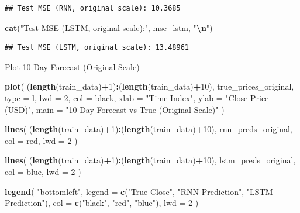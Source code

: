 \documentclass[
]{article}
\newenvironment{Shaded}{\begin{snugshade}}{\end{snugshade}}
\newcommand{\AttributeTok}[1]{\textcolor[rgb]{0.13,0.29,0.53}{#1}}
\newcommand{\DecValTok}[1]{\textcolor[rgb]{0.00,0.00,0.81}{#1}}
\newcommand{\FunctionTok}[1]{\textcolor[rgb]{0.13,0.29,0.53}{\textbf{#1}}}
\newcommand{\NormalTok}[1]{#1}
\newcommand{\SpecialCharTok}[1]{\textcolor[rgb]{0.81,0.36,0.00}{\textbf{#1}}}
\newcommand{\StringTok}[1]{\textcolor[rgb]{0.31,0.60,0.02}{#1}}
\begin{document}
\begin{verbatim}
## Test MSE (RNN, original scale): 10.3685
\end{verbatim}

\begin{Shaded}
\begin{Highlighting}[]
\FunctionTok{cat}\NormalTok{(}\StringTok{"Test MSE (LSTM, original scale):"}\NormalTok{, mse\_lstm, }\StringTok{"}\SpecialCharTok{\textbackslash{}n}\StringTok{"}\NormalTok{)}
\end{Highlighting}
\end{Shaded}

\begin{verbatim}
## Test MSE (LSTM, original scale): 13.48961
\end{verbatim}

Plot 10-Day Forecast (Original Scale)

\begin{Shaded}
\begin{Highlighting}[]
\FunctionTok{plot}\NormalTok{(}
\NormalTok{  (}\FunctionTok{length}\NormalTok{(train\_data)}\SpecialCharTok{+}\DecValTok{1}\NormalTok{)}\SpecialCharTok{:}\NormalTok{(}\FunctionTok{length}\NormalTok{(train\_data)}\SpecialCharTok{+}\DecValTok{10}\NormalTok{),}
\NormalTok{  true\_prices\_original,}
  \AttributeTok{type =} \StringTok{\textquotesingle{}l\textquotesingle{}}\NormalTok{, }
  \AttributeTok{lwd =} \DecValTok{2}\NormalTok{, }
  \AttributeTok{col =} \StringTok{\textquotesingle{}black\textquotesingle{}}\NormalTok{, }
  \AttributeTok{xlab =} \StringTok{"Time Index"}\NormalTok{, }
  \AttributeTok{ylab =} \StringTok{"Close Price (USD)"}\NormalTok{,}
  \AttributeTok{main =} \StringTok{"10{-}Day Forecast vs True (Original Scale)"}
\NormalTok{)}

\FunctionTok{lines}\NormalTok{(}
\NormalTok{  (}\FunctionTok{length}\NormalTok{(train\_data)}\SpecialCharTok{+}\DecValTok{1}\NormalTok{)}\SpecialCharTok{:}\NormalTok{(}\FunctionTok{length}\NormalTok{(train\_data)}\SpecialCharTok{+}\DecValTok{10}\NormalTok{),}
\NormalTok{  rnn\_preds\_original, }
  \AttributeTok{col =} \StringTok{\textquotesingle{}red\textquotesingle{}}\NormalTok{, }
  \AttributeTok{lwd =} \DecValTok{2}
\NormalTok{)}

\FunctionTok{lines}\NormalTok{(}
\NormalTok{  (}\FunctionTok{length}\NormalTok{(train\_data)}\SpecialCharTok{+}\DecValTok{1}\NormalTok{)}\SpecialCharTok{:}\NormalTok{(}\FunctionTok{length}\NormalTok{(train\_data)}\SpecialCharTok{+}\DecValTok{10}\NormalTok{),}
\NormalTok{  lstm\_preds\_original, }
  \AttributeTok{col =} \StringTok{\textquotesingle{}blue\textquotesingle{}}\NormalTok{, }
  \AttributeTok{lwd =} \DecValTok{2}
\NormalTok{)}

\FunctionTok{legend}\NormalTok{(}
  \StringTok{"bottomleft"}\NormalTok{, }
  \AttributeTok{legend =} \FunctionTok{c}\NormalTok{(}\StringTok{"True Close"}\NormalTok{, }\StringTok{"RNN Prediction"}\NormalTok{, }\StringTok{"LSTM Prediction"}\NormalTok{),}
  \AttributeTok{col =} \FunctionTok{c}\NormalTok{(}\StringTok{"black"}\NormalTok{, }\StringTok{"red"}\NormalTok{, }\StringTok{"blue"}\NormalTok{), }
  \AttributeTok{lwd =} \DecValTok{2}
\NormalTok{)}
\end{Highlighting}
\end{Shaded}
\end{document}
